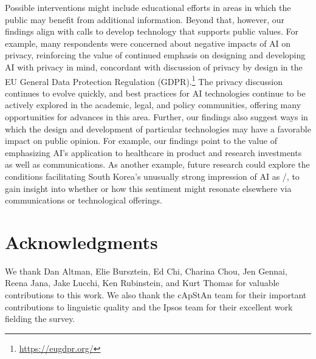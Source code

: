 \documentclass[11pt]{article} %
\begin{document}
Possible interventions might include educational efforts in areas in which the public may benefit from additional information. Beyond that, however, our findings align with calls to develop technology that supports public values. For example, many respondents were concerned about negative impacts of AI on privacy, reinforcing the value of continued emphasis on designing and developing AI with privacy in mind, concordant with discussion of privacy by design in the EU General Data Protection Regulation (GDPR).\footnote{\url{https://eugdpr.org/}} The privacy discussion continues to evolve quickly, and best practices for AI technologies continue to be actively explored in the academic, legal, and policy communities, offering many opportunities for advances in this area. Further, our findings also suggest ways in which the design and development of particular technologies may have a favorable impact on public opinion.  For example, our findings point to the value of emphasizing AI's application to healthcare in product and research investments as well as communications. As another example, future research could explore the conditions facilitating South Korea's unusually strong impression of AI as \Useful/, to gain insight into whether or how this sentiment might resonate elsewhere via communications or technological offerings.


\section*{Acknowledgments}
We thank Dan Altman, Elie Bursztein, Ed Chi, Charina Chou, Jen Gennai, Reena Jana, Jake Lucchi, Ken Rubinstein, and Kurt Thomas for valuable contributions to this work.
We also thank the cApStAn team for their important contributions to linguistic quality and the Ipsos team for their excellent work fielding the survey.
\end{document}
